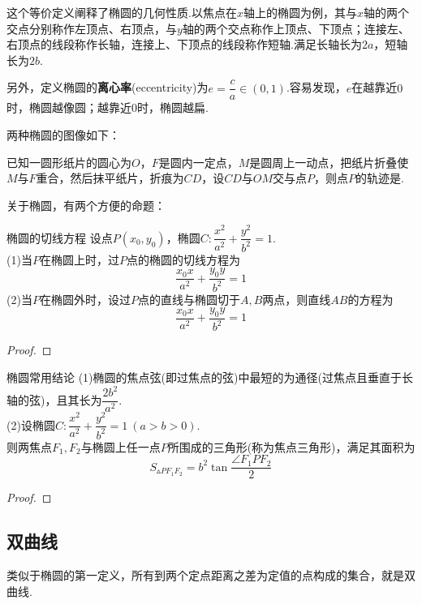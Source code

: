 \documentclass[lang=cn, zihao=5]{elegantbook}
\newcommand{\tk}{\uline{\hspace{4em}}}
\begin{document}
这个等价定义阐释了椭圆的几何性质.以焦点在$x$轴上的椭圆为例，其与$x$轴的两个交点分别称作左顶点、右顶点，与$y$轴的两个交点称作上顶点、下顶点；连接左、右顶点的线段称作长轴，连接上、下顶点的线段称作短轴.满足长轴长为$2a$，短轴长为$2b$.

另外，定义椭圆的\textbf{离心率}(eccentricity)为$e=\dfrac{c}{a} \in (0,1)$.容易发现，$e$在越靠近$0$时，椭圆越像圆；越靠近$0$时，椭圆越扁.

两种椭圆的图像如下：


\begin{example}
	已知一圆形纸片的圆心为$O$，$F$是圆内一定点，$M$是圆周上一动点，把纸片折叠使$M$与$F$重合，然后抹平纸片，折痕为$CD$，设$CD$与$OM$交与点$P$，则点$P$的轨迹是\tk .
\end{example}

关于椭圆，有两个方便的命题：

\begin{proposition}{椭圆的切线方程}
	设点$P(x_0,y_0)$，椭圆$C:\dfrac{x^2}{a^2}+\dfrac{y^2}{b^2}=1$. \\
	(1)当$P$在椭圆上时，过$P$点的椭圆的切线方程为$$\frac{x_0x}{a^2} + \frac{y_0y}{b^2} = 1$$
	(2)当$P$在椭圆外时，设过$P$点的直线与椭圆切于$A,B$两点，则直线$AB$的方程为$$\frac{x_0x}{a^2} + \frac{y_0y}{b^2} = 1$$
\end{proposition}
\begin{proof}
	
\end{proof}

\begin{proposition}{椭圆常用结论}
	(1)椭圆的焦点弦(即过焦点的弦)中最短的为通径(过焦点且垂直于长轴的弦)，且其长为$\dfrac{2b^2}{a^2}$. \\
	(2)设椭圆$C:\dfrac{x^2}{a^2}+\dfrac{y^2}{b^2}=1~(a>b>0)$. \\
	则两焦点$F_1,F_2$与椭圆上任一点$P$所围成的三角形(称为焦点三角形)，满足其面积为$$S_{\vartriangle PF_1F_2} = b^2\tan \frac{\angle F_1PF_2}{2}$$
\end{proposition}
\begin{proof}
	
\end{proof}

\subsection{双曲线}

类似于椭圆的第一定义，所有到两个定点距离之差为定值的点构成的集合，就是双曲线.
\end{document}
